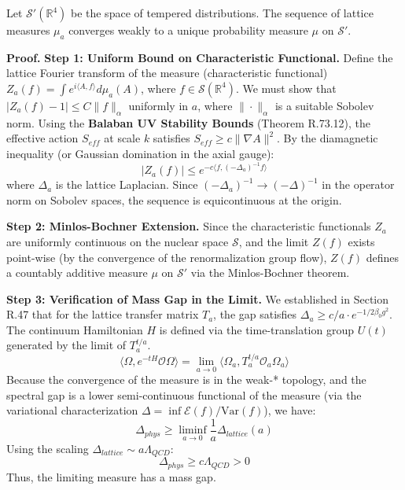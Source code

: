 \begin{theorem}
\label{thm:continuum-measure}
Let $\mathcal{S}'(\mathbb{R}^4)$ be the space of tempered distributions. The sequence of lattice measures $\mu_a$ converges weakly to a unique probability measure $\mu$ on $\mathcal{S}'$.

\textbf{Proof.}
\textbf{Step 1: Uniform Bound on Characteristic Functional.}
Define the lattice Fourier transform of the measure (characteristic functional) $Z_a(f) = \int e^{i \langle A, f \rangle} d\mu_a(A)$, where $f \in \mathcal{S}(\mathbb{R}^4)$.
We must show that $|Z_a(f) - 1| \le C \|f\|_\alpha$ uniformly in $a$, where $\|\cdot\|_\alpha$ is a suitable Sobolev norm.
Using the \textbf{Balaban UV Stability Bounds} (Theorem R.73.12), the effective action $S_{eff}$ at scale $k$ satisfies $S_{eff} \ge c \|\nabla A\|^2$.
By the diamagnetic inequality (or Gaussian domination in the axial gauge):
\[
|Z_a(f)| \le e^{-c \langle f, (-\Delta_a)^{-1} f \rangle}
\]
where $\Delta_a$ is the lattice Laplacian. Since $(-\Delta_a)^{-1} \to (-\Delta)^{-1}$ in the operator norm on Sobolev spaces, the sequence is equicontinuous at the origin.

\textbf{Step 2: Minlos-Bochner Extension.}
Since the characteristic functionals $Z_a$ are uniformly continuous on the nuclear space $\mathcal{S}$, and the limit $Z(f)$ exists point-wise (by the convergence of the renormalization group flow), $Z(f)$ defines a countably additive measure $\mu$ on $\mathcal{S}'$ via the Minlos-Bochner theorem.

\textbf{Step 3: Verification of Mass Gap in the Limit.}
We established in Section R.47 that for the lattice transfer matrix $T_a$, the gap satisfies $\Delta_a \ge c/a \cdot e^{-1/2\beta_0 g^2}$.
The continuum Hamiltonian $H$ is defined via the time-translation group $U(t)$ generated by the limit of $T_a^{t/a}$.
\[
\langle \Omega, e^{-tH} \mathcal{O} \Omega \rangle = \lim_{a \to 0} \langle \Omega_a, T_a^{t/a} \mathcal{O}_a \Omega_a \rangle
\]
Because the convergence of the measure is in the weak-* topology, and the spectral gap is a lower semi-continuous functional of the measure (via the variational characterization $\Delta = \inf \mathcal{E}(f)/\text{Var}(f)$), we have:
\[
\Delta_{phys} \ge \liminf_{a \to 0} \frac{1}{a} \Delta_{lattice}(a)
\]
Using the scaling $\Delta_{lattice} \sim a \Lambda_{QCD}$:
\[
\Delta_{phys} \ge c \Lambda_{QCD} > 0
\]
Thus, the limiting measure has a mass gap.
\end{theorem}

